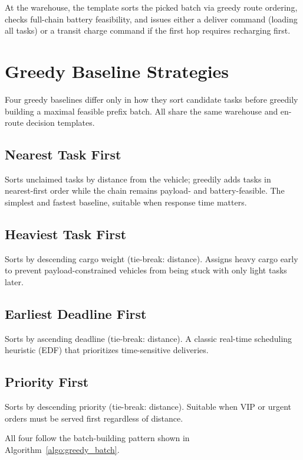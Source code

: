 At the warehouse, the template sorts the picked batch via greedy route ordering, checks full-chain battery feasibility, and issues either a deliver command (loading all tasks) or a transit charge command if the first hop requires recharging first.

\section{Greedy Baseline Strategies}

Four greedy baselines differ only in how they sort candidate tasks before greedily building a maximal feasible prefix batch. All share the same warehouse and en-route decision templates.

\subsection{Nearest Task First}

Sorts unclaimed tasks by distance from the vehicle; greedily adds tasks in nearest-first order while the chain remains payload- and battery-feasible. The simplest and fastest baseline, suitable when response time matters.

\subsection{Heaviest Task First}

Sorts by descending cargo weight (tie-break: distance). Assigns heavy cargo early to prevent payload-constrained vehicles from being stuck with only light tasks later.

\subsection{Earliest Deadline First}

Sorts by ascending deadline (tie-break: distance). A classic real-time scheduling heuristic (EDF) that prioritizes time-sensitive deliveries.

\subsection{Priority First}

Sorts by descending priority (tie-break: distance). Suitable when VIP or urgent orders must be served first regardless of distance.

All four follow the batch-building pattern shown in Algorithm~\ref{algo:greedy_batch}.

